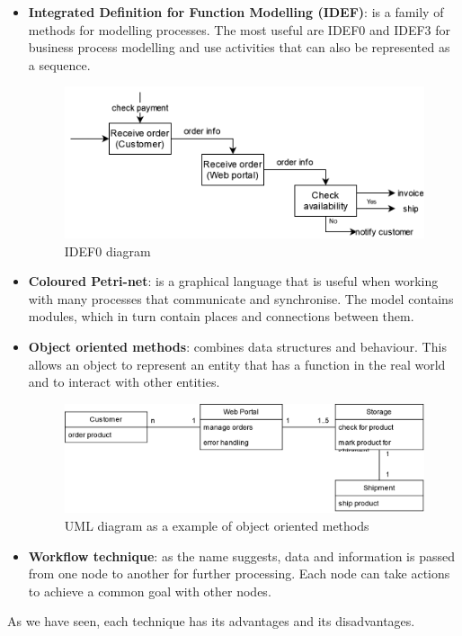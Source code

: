 \begin{itemize}
    \item \textbf{Integrated Definition for Function Modelling (IDEF)}: is a family of methods for modelling processes. The most useful are IDEF0 and IDEF3 for business process modelling and use activities that can also be represented as a sequence.

    \begin{figure}[h]
    \centering
    \includegraphics[width=\textwidth/2]{images/BPMN/idef_sample.drawio.png}
    \caption{\label{fig:bpmn_IDEF_diagram}IDEF0 diagram}
    \end{figure}
    
    \item \textbf{Coloured Petri-net}: is a graphical language that is useful when working with many processes that communicate and synchronise. The model contains modules, which in turn contain places and connections between them.
    
    \item \textbf{Object oriented methods}: combines data structures and behaviour. This allows an object to represent an entity that has a function in the real world and to interact with other entities.

    \begin{figure}[h]
    \centering
    \includegraphics[width=\textwidth/2]{images/BPMN/uml_sample.drawio.png}
    \caption{\label{fig:bpmn_uml_diagram}UML diagram as a example of object oriented methods}
    \end{figure}
    
    \item \textbf{Workflow technique}: as the name suggests, data and information is passed from one node to another for further processing. Each node can take actions to achieve a common goal with other nodes. 
    
\end{itemize}

As we have seen, each technique has its advantages and its disadvantages.
